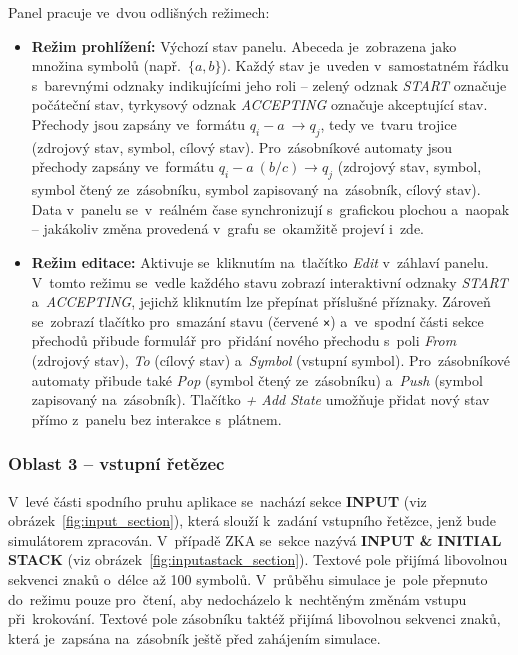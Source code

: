 \documentclass[
  master,
  program=ainfvs,
  printversion,
  figures=false,
  tables=false,
  glossaries,
  index
]{kidiplom}
\begin{document}
Panel pracuje ve~dvou odlišných režimech:
\begin{itemize} 
    \item \textbf{Režim prohlížení:} Výchozí stav panelu. Abeceda je~zobrazena jako množina symbolů (např.\ $\{a, b\}$). Každý stav je~uveden v~samostatném řádku s~barevnými odznaky indikujícími jeho roli -- zelený odznak \emph{START} označuje počáteční stav, tyrkysový odznak \emph{ACCEPTING} označuje akceptující stav. Přechody jsou zapsány ve~formátu $q_i - a~\rightarrow q_j$, tedy ve~tvaru trojice (zdrojový stav, symbol, cílový stav). Pro~zásobníkové automaty jsou přechody zapsány ve~formátu $q_i - a~(b/c) \rightarrow q_j$ (zdrojový stav, symbol, symbol čtený ze~zásobníku, symbol zapisovaný na~zásobník, cílový stav). Data v~panelu se~v~reálném čase synchronizují s~grafickou plochou a~naopak -- jakákoliv změna provedená v~grafu se~okamžitě projeví i~zde.

    \item \textbf{Režim editace:} Aktivuje se~kliknutím na~tlačítko \emph{Edit} v~záhlaví panelu. V~tomto režimu se~vedle každého stavu zobrazí interaktivní odznaky \emph{START} a~\emph{ACCEPTING}, jejichž kliknutím lze přepínat příslušné příznaky. Zároveň se~zobrazí tlačítko pro~smazání stavu (červené \texttt{×}) a~ve~spodní části sekce přechodů přibude formulář pro~přidání nového přechodu s~poli \emph{From} (zdrojový stav), \emph{To} (cílový stav) a~\emph{Symbol} (vstupní symbol). Pro~zásobníkové automaty přibude také \emph{Pop} (symbol čtený ze~zásobníku) a~\emph{Push} (symbol zapisovaný na~zásobník). Tlačítko \emph{+ Add State} umožňuje přidat nový stav přímo z~panelu bez interakce s~plátnem. 
\end{itemize}

\subsubsection{Oblast 3 -- vstupní řetězec}

V~levé části spodního pruhu aplikace se~nachází sekce \textbf{INPUT} (viz obrázek~\ref{fig:input_section}), která slouží k~zadání vstupního řetězce, jenž bude simulátorem zpracován. V~případě \gls{ZKA} se~sekce nazývá \textbf{INPUT \& INITIAL STACK} (viz obrázek~\ref{fig:inputastack_section}). Textové pole přijímá libovolnou sekvenci znaků o~délce až 100 symbolů. V~průběhu simulace je~pole přepnuto do~režimu pouze pro~čtení, aby nedocházelo k~nechtěným změnám vstupu při~krokování. Textové pole zásobníku taktéž přijímá libovolnou sekvenci znaků, která je~zapsána na~zásobník ještě před zahájením simulace.
\end{document}
